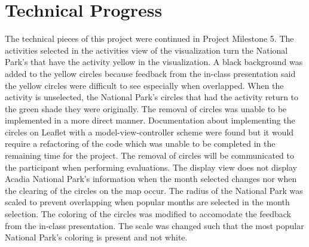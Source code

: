 \section{Technical Progress}

The technical pieces of this project were continued in Project Milestone 5. The activities selected in the activities view of the visualization turn the National Park's that have the activity yellow in the visualization. A black background was added to the yellow circles because feedback from the in-class presentation said the yellow circles were difficult to see especially when overlapped. When the activity is unselected, the National Park's circles that had the activity return to the green shade they were originally. The removal of circles was unable to be implemented in a more direct manner. Documentation about implementing the circles on Leaflet with a model-view-controller scheme were found but it would require a refactoring of the code which was unable to be completed in the remaining time for the project. The removal of circles will be communicated to the participant when performing evaluations. The display view does not display Acadia National Park's information when the month selected changes nor when the clearing of the circles on the map occur. The radius of the National Park was scaled to prevent overlapping when popular months are selected in the month selection. The coloring of the circles was modified to accomodate the feedback from the in-class presentation. The scale was changed such that the most popular National Park's coloring is present and not white. 

